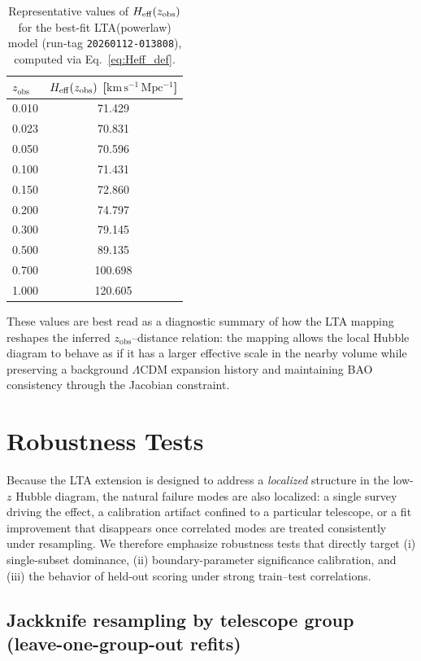 \documentclass[10pt]{article}
\newcommand{\zobs}{z_{\mathrm{obs}}}
\newcommand{\kmsMpc}{\mathrm{km\,s^{-1}\,Mpc^{-1}}}
\begin{document}
\begin{table}[!htbp]
\centering
\caption{Representative values of \(H_{\rm eff}(\zobs)\) for the best-fit LTA(powerlaw) model
(run-tag \texttt{20260112-013808}), computed via Eq.~\eqref{eq:Heff_def}.}
\label{tab:heff_values}
\begin{tabular}{lc}
\toprule
\(\zobs\) & \(H_{\rm eff}(\zobs)\) [\(\kmsMpc\)] \\
\midrule
0.010 & 71.429 \\
0.023 & 70.831 \\
0.050 & 70.596 \\
0.100 & 71.431 \\
0.150 & 72.860 \\
0.200 & 74.797 \\
0.300 & 79.145 \\
0.500 & 89.135 \\
0.700 & 100.698 \\
1.000 & 120.605 \\
\bottomrule
\end{tabular}
\end{table}

These values are best read as a diagnostic summary of how the LTA mapping reshapes the inferred
\(\zobs\)--distance relation: the mapping allows the local Hubble diagram to behave as if it has a
larger effective scale in the nearby volume while preserving a background $\Lambda$CDM expansion
history and maintaining BAO consistency through the Jacobian constraint.
\section{Robustness Tests}
\label{sec:robustness}

Because the LTA extension is designed to address a \emph{localized} structure in the low-$z$ Hubble
diagram, the natural failure modes are also localized: a single survey driving the effect, a
calibration artifact confined to a particular telescope, or a fit improvement that disappears once
correlated modes are treated consistently under resampling. We therefore emphasize robustness tests
that directly target (i) single-subset dominance, (ii) boundary-parameter significance calibration,
and (iii) the behavior of held-out scoring under strong train--test correlations.

\subsection{Jackknife resampling by telescope group (leave-one-group-out refits)}
\label{sec:jackknife}
\end{document}
